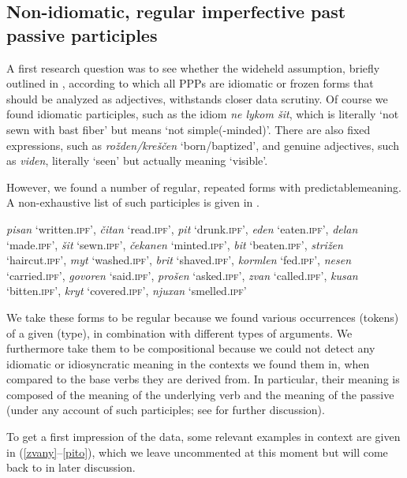 \documentclass[output=paper,modfonts,newtxmath,hidelinks
\ChapterDOI{10.5281/zenodo.2545513}
]{langscibook}
\begin{document}
\subsection{Non-idiomatic, regular imperfective past passive participles} 
\label{nonidiom}

A first research question was to see whether the wideheld assumption, briefly outlined in , according to which all  PPPs are idiomatic or frozen forms that should be analyzed as adjectives, withstands closer data scrutiny. Of course we found idiomatic participles, such as the idiom \textit{ne lykom šit}, which is literally `not sewn with bast fiber' but means `not simple(-minded)'. There are also fixed expressions, such as \textit{rožden/kreščen} `born/baptized', and genuine adjectives, such as \textit{viden}, literally `seen' but actually meaning `visible'.

However, we found a number of regular, repeated forms with predictable\linebreak meaning. A non-exhaustive list of such participles is given in .

\ea	\textit{pisan} `written.\textsc{ipf}', \textit{čitan} `read.\textsc{ipf}', \textit{pit} `drunk.\textsc{ipf}', \textit{eden} `eaten.\textsc{ipf}', \textit{delan} `made.\textsc{ipf}', \textit{šit} `sewn.\textsc{ipf}', \textit{čekanen} `minted.\textsc{ipf}', \textit{bit} `beaten.\textsc{ipf}', \textit{strižen} `haircut.\textsc{ipf}', \textit{myt} `washed.\textsc{ipf}', \textit{brit} `shaved.\textsc{ipf}', \textit{kormlen} `fed.\textsc{ipf}', \textit{nesen} `carried.\textsc{ipf}', \textit{govoren} `said.\textsc{ipf}', \textit{prošen} `asked.\textsc{ipf}', \textit{zvan} `called.\textsc{ipf}', \textit{kusan} `bitten.\textsc{ipf}', \textit{kryt} `covered.\textsc{ipf}', \textit{njuxan} `smelled.\textsc{ipf}' \label{list}
\z

\noindent We take these forms to be regular because we found various occurrences (tokens) of a given  (type), in combination with different types of arguments. We furthermore take them to be compositional because we could not detect any idiomatic or idiosyncratic meaning in the contexts we found them in, when compared to the base verbs they are derived from. In particular, their meaning is composed of the meaning of the underlying verb and the meaning of the  passive  (under any account of such participles; see  for further discussion). 

To get a first impression of the data, some relevant examples in context are given in (\ref{zvany}--\ref{pito}), which we leave uncommented at this moment but will come back to in later discussion. 
\end{document}
